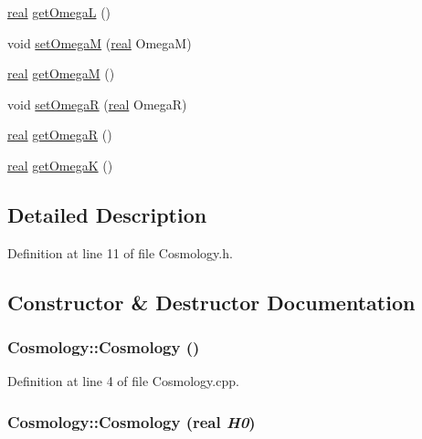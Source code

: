 \begin{DoxyCompactItemize}
\item 
\hyperlink{Global_8h_a031f8951175b43076c2084a6c2173410}{real} \hyperlink{classCosmology_aca57afe74a4f674d4006fc34d84e5477}{getOmegaL} ()
\item 
void \hyperlink{classCosmology_a30a53cfb18962531ddb58ec3746d817c}{setOmegaM} (\hyperlink{Global_8h_a031f8951175b43076c2084a6c2173410}{real} OmegaM)
\item 
\hyperlink{Global_8h_a031f8951175b43076c2084a6c2173410}{real} \hyperlink{classCosmology_a6ef569243dfcd76426f03b0fd0b3307d}{getOmegaM} ()
\item 
void \hyperlink{classCosmology_a78936b436ca3c5fd1cfc4154cd695941}{setOmegaR} (\hyperlink{Global_8h_a031f8951175b43076c2084a6c2173410}{real} OmegaR)
\item 
\hyperlink{Global_8h_a031f8951175b43076c2084a6c2173410}{real} \hyperlink{classCosmology_a930f85ca62d601eb47989f09675077e8}{getOmegaR} ()
\item 
\hyperlink{Global_8h_a031f8951175b43076c2084a6c2173410}{real} \hyperlink{classCosmology_a671dcd13edd6c792d0dd791021bc045f}{getOmegaK} ()
\end{DoxyCompactItemize}


\subsection{Detailed Description}


Definition at line 11 of file Cosmology.h.



\subsection{Constructor \& Destructor Documentation}
\subsubsection[{Cosmology}]{\setlength{\rightskip}{0pt plus 5cm}Cosmology::Cosmology ()}\label{classCosmology_a65605ac821284585c4b7cec76506c0cd}


Definition at line 4 of file Cosmology.cpp.

\subsubsection[{Cosmology}]{\setlength{\rightskip}{0pt plus 5cm}Cosmology::Cosmology ({\bf real} {\em H0})}\label{classCosmology_a8203287b6ef58664a6975d659b496d7c}



